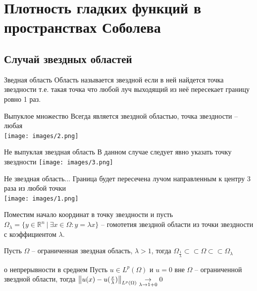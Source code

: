 \documentclass[12pt,a4paper]{article}
\newcommand{\Real}{\mathbb{R}}
\newcommand{\ssubset}{\subset \subset}
\begin{document}
\section{Плотность гладких функций в пространствах Соболева}

\subsection{Случай звездных областей}

\begin{definition}{Зведная область}{}
	Область называется звездной если в ней найдется точка звездности т.е. такая точка что любой луч выходящий из неё пересекает границу ровно 1 раз.
\end{definition}

\begin{example}{Выпуклое множество}{}
	Всегда является звездной областью, точка звездности -- любая \\
	\texttt{[image: images/2.png]}
\end{example}

\begin{example}{Не выпуклая звездная область}{}
	В данном случае следует явно указать точку звездности
	\texttt{[image: images/3.png]}
\end{example}

\begin{example}{Не звездная область...}{}
	Граница будет пересечена лучом направленным к центру 3 раза из любой точки \\
	\texttt{[image: images/1.png]}
\end{example}

Поместим начало координат в точку звездности и пусть \\ $\Omega_\lambda = \{y \in \Real^n \ | \ \exists x \in \Omega: y = \lambda x\}$ -- гомотетия звездной области из точки звездности с коэффициентом $\lambda$.
\begin{proposition}{}{}
	Пусть $\Omega$ -- ограниченная звездная область, $\lambda > 1$, тогда $\Omega_{\frac{1}{\lambda}} \ssubset \Omega \ssubset \Omega_{\lambda}$
\end{proposition}

\begin{lemma}{о непрерывности в среднем}{}
	Пусть $u \in L^p (\Omega)$ и $u = 0$ вне $\Omega$ -- ограниченной звездной области, тогда 
	$\norm{u(x) - u(\frac{x}{\lambda})}_{L^p (\Omega)} \underset{\lambda \to 1 + 0}{\to} 0$
\end{lemma}
\end{document}
